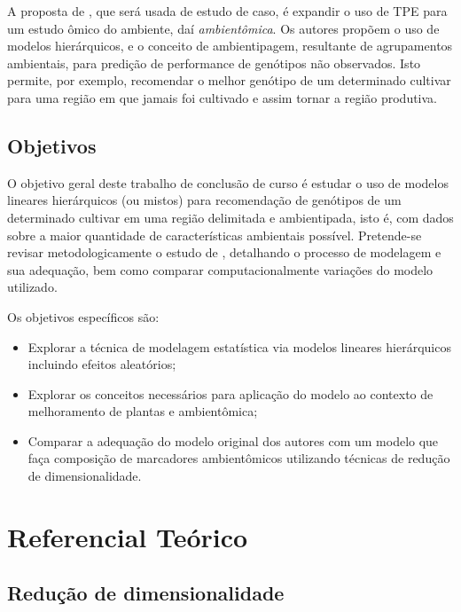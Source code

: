 \documentclass[12pt, a4paper, twoside]{report}
\numberwithin{equation}{subsection} %
\begin{document}
A proposta de \citep{resende2020enviromics}, que será usada de estudo de caso, é expandir o uso de TPE para um estudo ômico do ambiente, daí \textit{ambientômica}. Os autores propõem o uso de modelos hierárquicos, e o conceito de ambientipagem, resultante de agrupamentos ambientais, para predição de performance de genótipos não observados. Isto permite, por exemplo, recomendar o melhor genótipo de um determinado cultivar para uma região em que jamais foi cultivado e assim tornar a região produtiva.

\section{Objetivos}

O objetivo geral deste trabalho de conclusão de curso é estudar o uso de modelos lineares hierárquicos (ou mistos) para recomendação de genótipos de um determinado cultivar em uma região delimitada e ambientipada, isto é, com dados sobre a maior quantidade de características ambientais possível. Pretende-se revisar metodologicamente o estudo de \citep{resende2020enviromics}, detalhando o processo de modelagem e sua adequação, bem como comparar computacionalmente variações do modelo utilizado.

 
Os objetivos específicos são:

  \begin{itemize}
  \item Explorar a técnica de modelagem estatística via modelos lineares hierárquicos incluindo efeitos aleatórios;
  \item Explorar os conceitos necessários para aplicação do modelo ao contexto de melhoramento de plantas e ambientômica;
  \item Comparar a adequação do modelo original dos autores com um modelo que faça composição de marcadores ambientômicos utilizando técnicas de redução de dimensionalidade.
 \end{itemize}
 
 \chapter{Referencial Teórico}
 
 \section{Redução de dimensionalidade}
 
\end{document}
